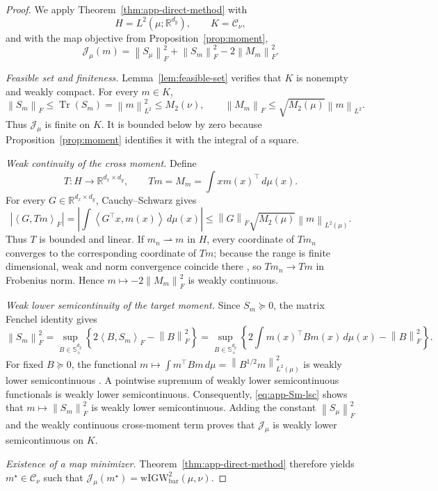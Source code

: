 \documentclass[11pt]{article}
\newcommand{\R}{\mathbb R}
\newcommand{\ip}[2]{\left\langle #1,#2\right\rangle}
\newcommand{\norm}[1]{\left\lVert #1\right\rVert}
\newcommand{\wIGW}{\mathrm{wIGW}_{\mathrm{bar}}}
\DeclareMathOperator{\Tr}{Tr}
\theoremstyle{plain}
\theoremstyle{definition}
\theoremstyle{remark}
\begin{document}
\begin{proof}
We apply Theorem~\ref{thm:app-direct-method} with
\[
 H=L^2(\mu;\R^{d_y}),\qquad K=\mathcal C_\nu,
\]
and with the map objective from Proposition~\ref{prop:moment},
\[
 \mathcal J_\mu(m)
 =\norm{S_\mu}_F^2+\norm{S_m}_F^2-2\norm{M_m}_F^2.
\]

\emph{Feasible set and finiteness.}
Lemma~\ref{lem:feasible-set} verifies that $K$ is nonempty and weakly compact.
For every $m\in K$,
\[
 \norm{S_m}_F\le\Tr(S_m)=\norm{m}_{L^2}^2\le M_2(\nu),
 \qquad
 \norm{M_m}_F\le\sqrt{M_2(\mu)}\norm{m}_{L^2}.
\]
Thus $\mathcal J_\mu$ is finite on $K$.  It is bounded below by zero because
Proposition~\ref{prop:moment} identifies it with the integral of a square.

\emph{Weak continuity of the cross moment.}
Define
\[
 T:H\to\R^{d_x\times d_y},\qquad
 Tm=M_m=\int x m(x)^\top\,d\mu(x).
\]
For every $G\in\R^{d_x\times d_y}$, Cauchy--Schwarz gives
\[
 \left|\ip{G}{Tm}_F\right|
 =\left|\int\ip{G^\top x}{m(x)}\,d\mu(x)\right|
 \le\norm{G}_F\sqrt{M_2(\mu)}\norm{m}_{L^2(\mu)}.
\]
Thus $T$ is bounded and linear.  If $m_n\rightharpoonup m$ in $H$, every
coordinate of $Tm_n$ converges to the corresponding coordinate of $Tm$; because
the range is finite dimensional, weak and norm convergence coincide there
\cite[Proposition~3.6 and Theorem~3.10]{BrezisFA}, so
$Tm_n\to Tm$ in Frobenius norm.  Hence
$m\mapsto-2\norm{M_m}_F^2$ is weakly continuous.

\emph{Weak lower semicontinuity of the target moment.}
Since $S_m\succeq0$, the matrix Fenchel identity gives
\begin{equation}\label{eq:app-Sm-lsc}
 \norm{S_m}_F^2
 =\sup_{B\in\mathbb S_+^{d_y}}
 \left\{2\ip{B}{S_m}_F-\norm{B}_F^2\right\}
 =\sup_{B\in\mathbb S_+^{d_y}}
 \left\{2\int m(x)^\top Bm(x)\,d\mu(x)-\norm{B}_F^2\right\}.
\end{equation}
For fixed $B\succeq0$, the functional
$m\mapsto\int m^\top Bm\,d\mu=\norm{B^{1/2}m}_{L^2(\mu)}^2$ is weakly
lower semicontinuous \cite[Proposition~3.5(iii)]{BrezisFA}.  A pointwise supremum
of weakly lower semicontinuous functionals is weakly lower semicontinuous.
Consequently, \eqref{eq:app-Sm-lsc} shows that
$m\mapsto\norm{S_m}_F^2$ is weakly lower semicontinuous.  Adding the constant
$\norm{S_\mu}_F^2$ and the weakly continuous cross-moment term proves that
$\mathcal J_\mu$ is weakly lower semicontinuous on $K$.

\emph{Existence of a map minimizer.}
Theorem~\ref{thm:app-direct-method} therefore yields
$m^\star\in\mathcal C_\nu$ such that
$\mathcal J_\mu(m^\star)=\wIGW^2(\mu,\nu)$.


\end{proof}
\end{document}
